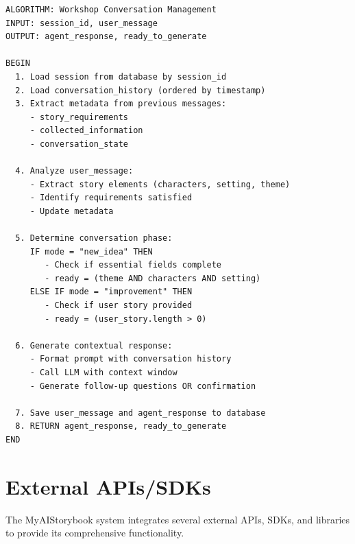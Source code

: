 \begin{verbatim}
ALGORITHM: Workshop Conversation Management
INPUT: session_id, user_message
OUTPUT: agent_response, ready_to_generate

BEGIN
  1. Load session from database by session_id
  2. Load conversation_history (ordered by timestamp)
  3. Extract metadata from previous messages:
     - story_requirements
     - collected_information
     - conversation_state
  
  4. Analyze user_message:
     - Extract story elements (characters, setting, theme)
     - Identify requirements satisfied
     - Update metadata
  
  5. Determine conversation phase:
     IF mode = "new_idea" THEN
        - Check if essential fields complete
        - ready = (theme AND characters AND setting)
     ELSE IF mode = "improvement" THEN
        - Check if user story provided
        - ready = (user_story.length > 0)
  
  6. Generate contextual response:
     - Format prompt with conversation history
     - Call LLM with context window
     - Generate follow-up questions OR confirmation
  
  7. Save user_message and agent_response to database
  8. RETURN agent_response, ready_to_generate
END
\end{verbatim}

\section{External APIs/SDKs}

The MyAIStorybook system integrates several external APIs, SDKs, and libraries to provide its comprehensive functionality.

